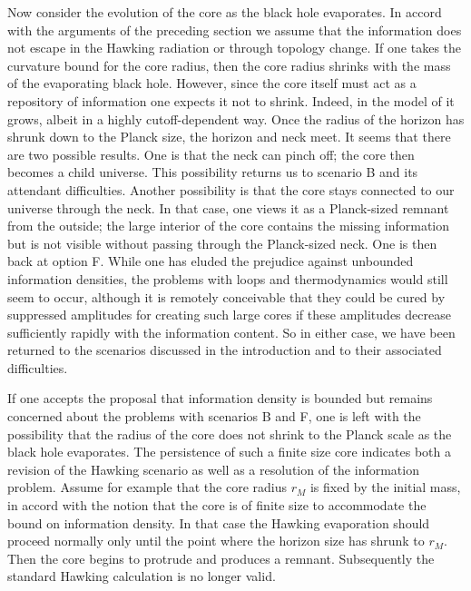 Now consider the evolution of the core as the black hole evaporates.
In accord with the arguments of the preceding section we assume that the
information does not escape in the Hawking radiation or through topology
change.  If one takes the curvature bound for the core radius, then the
core radius shrinks with the mass of the evaporating black hole.
However, since the core itself
must act as a repository of information one expects
it not to shrink. Indeed, in the model of  it grows, albeit in
a highly cutoff-dependent way.  Once the radius of the horizon has shrunk
down to the Planck size, the horizon and neck meet.  It seems that there
are two possible results.
One is that the neck can pinch off; the core
then becomes a child universe.  This possibility returns us to scenario B
and its attendant difficulties.  Another possibility is that the core stays
connected to our universe through the neck.  In that case, one views it as
a Planck-sized remnant from the outside; the large interior of the core
contains the missing information but is not visible without passing
through the Planck-sized neck.  One is then back at option F.  While one
has eluded the prejudice against unbounded information densities, the
problems with loops and thermodynamics would still seem to
occur, although it is
remotely conceivable that they could be cured by suppressed
amplitudes for creating such large cores if these
amplitudes decrease sufficiently
rapidly  with the
information content.  So in either case, we have been returned to the
scenarios discussed in the introduction and to their associated difficulties.


If one accepts the proposal that information density is bounded but remains
concerned about the problems with scenarios B and F, one is left with the
possibility that the radius of the core does not shrink to the Planck scale
as the black hole evaporates.  The persistence of such a finite size core
indicates both a revision of the Hawking scenario as well as a
resolution of the information problem.  Assume for example that the core
radius $r_M$
is fixed by the initial mass, in accord with the notion that the
core is of finite size to accommodate the bound on information
density.  In that case the Hawking evaporation should proceed
normally only until the point where the horizon size has shrunk to
$r_M$.  Then the core begins to protrude and produces a remnant.
Subsequently the standard
Hawking
calculation is no longer valid.


